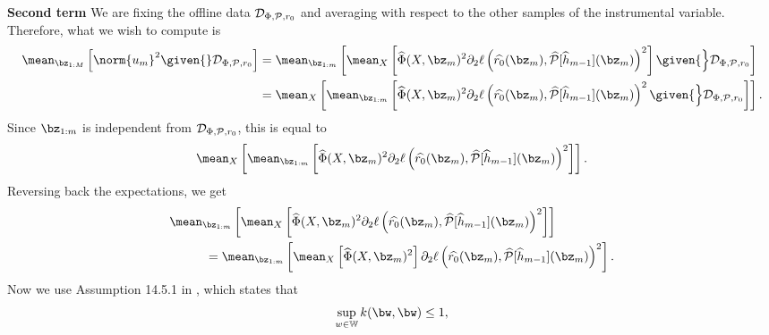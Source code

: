 \textbf{Second term }
We are fixing the offline data $ \mathcal{D}_{ \Phi, \mathcal{P}, r_{ 0 } } $ and averaging with respect to the other samples of the instrumental variable.
Therefore, what we wish to compute is
\begin{align*}
    \mean_{ \bz_{ 1:M } } \left[
        \norm{ u_{ m } }^2
        \given{} \dataoff
    \right]
    &= \mean_{ \bz_{ 1:m } } \left[
        \mean_{ X } \left[
            \hat{ \Phi } ( X, \bz_{ m } )^2
            \partial_{ 2 } \ell \left(
                \hat{ r_{ 0 } } ( \bz_{ m } ),
                \hat{ \meanop } [ \hat{ h }_{ m-1 } ] ( \bz_{ m } )
            \right)^2
        \right]
        \given{\Big} \dataoff
    \right] \\
    &= \mean_{ X } \left[
        \mean_{ \bz_{ 1:m } } \left[
            \hat{ \Phi } ( X, \bz_{ m } )^2
            \partial_{ 2 } \ell \left(
                \hat{ r_{ 0 } } ( \bz_{ m } ),
                \hat{ \meanop } [ \hat{ h }_{ m-1 } ] ( \bz_{ m } )
            \right)^2
            \given{\Big} \dataoff
        \right]
    \right]
.\end{align*}
Since $ \bz_{ 1:m } $ is independent from $ \mathcal{D}_{ \Phi, \mathcal{P}, r_{ 0 } } $, this is equal to
\begin{equation*}
    \mean_{ X } \left[
        \mean_{ \bz_{ 1:m } } \left[
            \hat{ \Phi } ( X, \bz_{ m } )^2
            \partial_{ 2 } \ell \left(
                \hat{ r_{ 0 } } ( \bz_{ m } ),
                \hat{ \meanop } [ \hat{ h }_{ m-1 } ] ( \bz_{ m } )
            \right)^2
        \right]
    \right]
.\end{equation*}
Reversing back the expectations, we get
\begin{align*}
    &\mean_{ \bz_{ 1:m } } \left[
        \mean_{ X } \left[
            \hat{ \Phi } ( X, \bz_{ m } )^2
            \partial_{ 2 } \ell \left(
                \hat{ r_{ 0 } } ( \bz_{ m } ),
                \hat{ \meanop } [ \hat{ h }_{ m-1 } ] ( \bz_{ m } )
            \right)^2
        \right]
    \right] \\
    &\hspace{1cm}=
    \mean_{ \bz_{ 1:m } } \left[
        \mean_{ X } \left[
            \hat{ \Phi } ( X, \bz_{ m } )^2
        \right]
        \partial_{ 2 } \ell \left(
            \hat{ r_{ 0 } } ( \bz_{ m } ),
            \hat{ \meanop } [ \hat{ h }_{ m-1 } ] ( \bz_{ m } )
        \right)^2
    \right]
.\end{align*}
Now we use Assumption 14.5.1 in \cite{sugiyama2012}, which states that
\begin{equation*}
    \sup_{ w \in \mathbb{W} } k ( \bw, \bw ) \leq 1
,\end{equation*}
